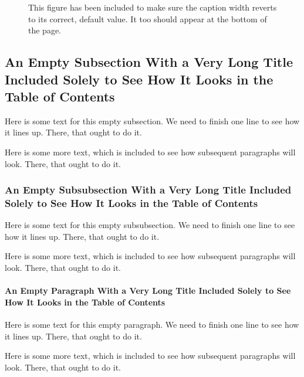 \documentclass[phd, 12pt, print]{fauthesis}
\begin{document}
\begin{figure}[b]
\begin{center}
\parbox{1.0\columnwidth}{\hrulefill{}\quad\hrulefill}
\parbox{0.8\columnwidth}{\hrulefill{}\quad\hrulefill}
\parbox{0.6\columnwidth}{\hrulefill{}\quad\hrulefill}
\parbox{0.4\columnwidth}{\hrulefill{}\quad\hrulefill}
\end{center}
\caption[Another sample figure]{This figure has been included to make sure the caption width reverts to its correct, default value.  It too should appear at the bottom of the page.}
\end{figure}

\subsection{An Empty Subsection With a Very Long Title Included Solely to See How It Looks in the Table of Contents}

Here is some text for this empty subsection.  We need to finish one line to see how it lines up.  There, that ought to do it.

Here is some more text, which is included to see how subsequent paragraphs will look.  There, that ought to do it.

\subsubsection{An Empty Subsubsection With a Very Long Title Included Solely to See How It Looks in the Table of Contents}

Here is some text for this empty subsubsection.  We need to finish one line to see how it lines up.  There, that ought to do it.

Here is some more text, which is included to see how subsequent paragraphs will look.  There, that ought to do it.

\paragraph{An Empty Paragraph With a Very Long Title Included Solely to See How It Looks in the Table of Contents}

Here is some text for this empty paragraph.  We need to finish one line to see how it lines up.  There, that ought to do it.

Here is some more text, which is included to see how subsequent paragraphs will look.  There, that ought to do it.
\end{document}

